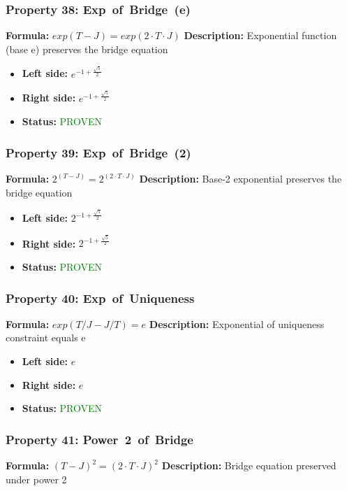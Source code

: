 \subsubsection*{Property 38: Exp~of~Bridge~(e)}
\textbf{Formula:} $exp(T-J) = exp(2 \cdot T \cdot J)$
\textbf{Description:} Exponential function (base e) preserves the bridge equation

\begin{itemize}
\item \textbf{Left side:} $e^{-1 + \frac{\sqrt{5}}{2}}$
\item \textbf{Right side:} $e^{-1 + \frac{\sqrt{5}}{2}}$
\item \textbf{Status:} \textcolor{green}{PROVEN}
\end{itemize}

\subsubsection*{Property 39: Exp~of~Bridge~(2)}
\textbf{Formula:} $2^(T-J) = 2^(2 \cdot T \cdot J)$
\textbf{Description:} Base-2 exponential preserves the bridge equation

\begin{itemize}
\item \textbf{Left side:} $2^{-1 + \frac{\sqrt{5}}{2}}$
\item \textbf{Right side:} $2^{-1 + \frac{\sqrt{5}}{2}}$
\item \textbf{Status:} \textcolor{green}{PROVEN}
\end{itemize}

\subsubsection*{Property 40: Exp~of~Uniqueness}
\textbf{Formula:} $exp(T/J - J/T) = e$
\textbf{Description:} Exponential of uniqueness constraint equals e

\begin{itemize}
\item \textbf{Left side:} $e$
\item \textbf{Right side:} $e$
\item \textbf{Status:} \textcolor{green}{PROVEN}
\end{itemize}

\subsubsection*{Property 41: Power~2~of~Bridge}
\textbf{Formula:} $(T-J)^2 = (2 \cdot T \cdot J)^2$
\textbf{Description:} Bridge equation preserved under power 2

